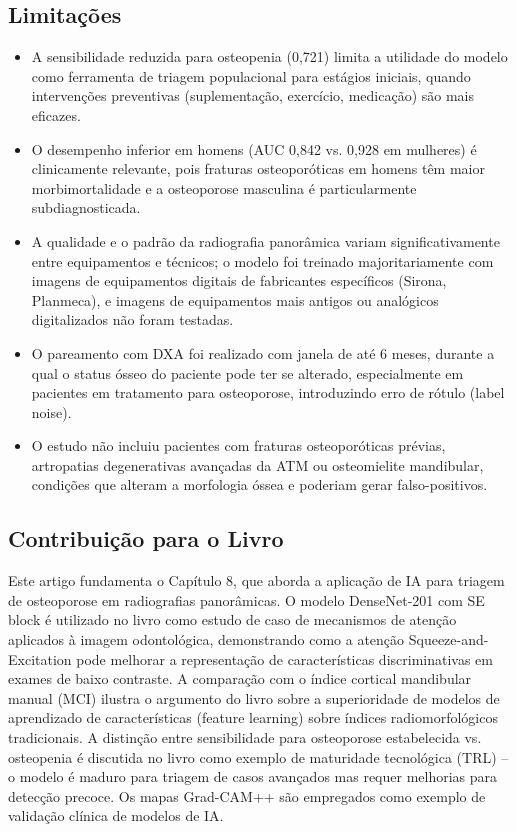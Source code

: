 \subsection{Limitações}
\begin{itemize}
  \item A sensibilidade reduzida para osteopenia (0,721) limita a
        utilidade do modelo como ferramenta de triagem populacional
        para estágios iniciais, quando intervenções preventivas
        (suplementação, exercício, medicação) são mais eficazes.
  \item O desempenho inferior em homens (AUC 0,842 vs. 0,928 em
        mulheres) é clinicamente relevante, pois fraturas
        osteoporóticas em homens têm maior morbimortalidade e a
        osteoporose masculina é particularmente subdiagnosticada.
  \item A qualidade e o padrão da radiografia panorâmica variam
        significativamente entre equipamentos e técnicos; o modelo
        foi treinado majoritariamente com imagens de equipamentos
        digitais de fabricantes específicos (Sirona, Planmeca), e
        imagens de equipamentos mais antigos ou analógicos
        digitalizados não foram testadas.
  \item O pareamento com DXA foi realizado com janela de até 6 meses,
        durante a qual o status ósseo do paciente pode ter se
        alterado, especialmente em pacientes em tratamento para
        osteoporose, introduzindo erro de rótulo (label noise).
  \item O estudo não incluiu pacientes com fraturas osteoporóticas
        prévias, artropatias degenerativas avançadas da ATM ou
        osteomielite mandibular, condições que alteram a morfologia
        óssea e poderiam gerar falso-positivos.
\end{itemize}

\subsection{Contribuição para o Livro}
Este artigo fundamenta o Capítulo 8, que aborda a aplicação de IA para
triagem de osteoporose em radiografias panorâmicas. O modelo DenseNet-201
com SE block é utilizado no livro como estudo de caso de mecanismos de
atenção aplicados à imagem odontológica, demonstrando como a atenção
Squeeze-and-Excitation pode melhorar a representação de características
discriminativas em exames de baixo contraste. A comparação com o índice
cortical mandibular manual (MCI) ilustra o argumento do livro sobre a
superioridade de modelos de aprendizado de características
(feature learning) sobre índices radiomorfológicos tradicionais. A
distinção entre sensibilidade para osteoporose estabelecida vs.
osteopenia é discutida no livro como exemplo de maturidade tecnológica
(TRL) -- o modelo é maduro para triagem de casos avançados mas requer
melhorias para detecção precoce. Os mapas Grad-CAM++ são empregados
como exemplo de validação clínica de modelos de IA.

